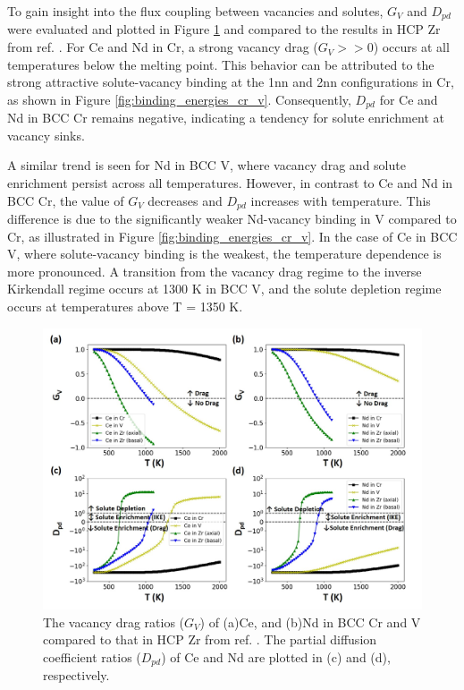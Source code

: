 \documentclass[preprint,12pt]{elsarticle}
\begin{document}
To gain insight into the flux coupling between vacancies and solutes, $G_V$ and $D_{pd}$ were evaluated and plotted in Figure \ref{fig:drag_cr_v} and compared to the results in HCP Zr from ref. \cite{shousha2024first}. For Ce and Nd in Cr, a strong vacancy drag ($G_V >> 0$) occurs at all temperatures below the melting point. This behavior can be attributed to the strong attractive solute-vacancy binding at the 1nn and 2nn configurations in Cr, as shown in Figure \ref{fig:binding_energies_cr_v}. Consequently, $D_{pd}$ for Ce and Nd in BCC Cr remains negative, indicating a tendency for solute enrichment at vacancy sinks.

A similar trend is seen for Nd in BCC V, where vacancy drag and solute enrichment persist across all temperatures. However, in contrast to Ce and Nd in BCC Cr, the value of $G_V$ decreases and $D_{pd}$ increases with temperature. This difference is due to the significantly weaker Nd-vacancy binding in V compared to Cr, as illustrated in Figure \ref{fig:binding_energies_cr_v}. In the case of Ce in BCC V, where solute-vacancy binding is the weakest, the temperature dependence is more pronounced. A transition from the vacancy drag regime to the inverse Kirkendall regime occurs at 1300 K in BCC V, and the solute depletion regime occurs at temperatures above T = 1350 K.



\begin{figure}[h]
    \centering
    \includegraphics[width=0.99\linewidth]{drag_ratios_pdc_cr_v.jpg}
    \caption{The vacancy drag ratios ($G_V$) of (a)Ce, and (b)Nd in BCC Cr and V compared to that in HCP Zr from ref. \cite{shousha2024first}. The partial diffusion coefficient ratios ($D_{pd}$) of Ce and Nd are plotted in (c) and (d), respectively.}
    \label{fig:drag_cr_v}
\end{figure}
\end{document}
